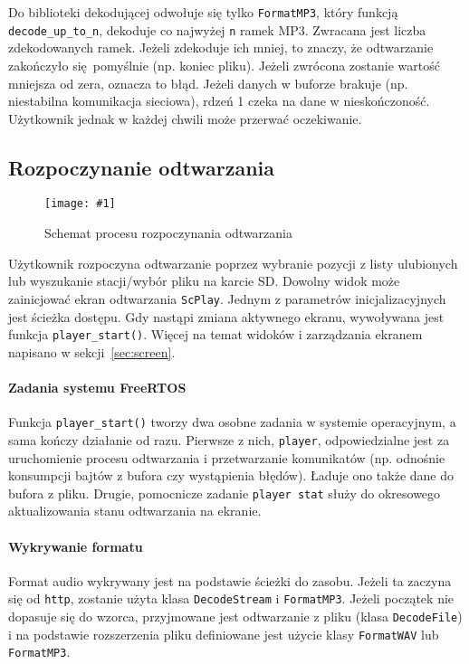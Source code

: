 \documentclass[polish]{aghengthesis}
\newcommand{\imgint}[4]{
	\begin{figure}[{#4}]
		\centering
		\texttt{[image: \#1]}
		\caption{#2}
		\label{#1}
	\end{figure}
}
\newcommand{\imgcs}[3]{\imgint{#1}{#2}{#3}{}}
\begin{document}
			Do biblioteki dekodującej odwołuje się tylko \lstinline|FormatMP3|, który funkcją \lstinline|decode_up_to_n|, dekoduje co najwyżej \lstinline|n| ramek MP3. Zwracana jest liczba zdekodowanych ramek. Jeżeli zdekoduje ich mniej, to znaczy, że odtwarzanie zakończyło się pomyślnie (np. koniec pliku). Jeżeli zwrócona zostanie wartość mniejsza od zera, oznacza to błąd. Jeżeli danych w buforze brakuje (np. niestabilna komunikacja sieciowa), rdzeń 1 czeka na dane w nieskończoność. Użytkownik jednak w każdej chwili może przerwać oczekiwanie.
		
		\subsection{Rozpoczynanie odtwarzania}
			\imgcs{3/PicoRadio-start}{Schemat procesu rozpoczynania odtwarzania}{0.7}
			Użytkownik rozpoczyna odtwarzanie poprzez wybranie pozycji z listy ulubionych lub wyszukanie stacji/wybór pliku na karcie SD. Dowolny widok może zainicjować ekran odtwarzania \lstinline|ScPlay|. Jednym z parametrów inicjalizacyjnych jest ścieżka dostępu. Gdy nastąpi zmiana aktywnego ekranu, wywoływana jest funkcja \lstinline|player_start()|. Więcej na temat widoków i zarządzania ekranem napisano w sekcji~\ref{sec:screen}.
			
			\paragraph{Zadania systemu FreeRTOS}
				Funkcja \lstinline|player_start()| tworzy dwa osobne zadania w systemie operacyjnym, a sama kończy działanie od razu. Pierwsze z nich, \lstinline|player|, odpowiedzialne jest za uruchomienie procesu odtwarzania i przetwarzanie komunikatów (np. odnośnie konsumpcji bajtów z bufora czy wystąpienia błędów). Ładuje ono także dane do bufora z pliku. Drugie, pomocnicze zadanie \lstinline|player stat| służy do okresowego aktualizowania stanu odtwarzania na ekranie.
			
			\paragraph{Wykrywanie formatu}
				Format audio wykrywany jest na podstawie ścieżki do zasobu. Jeżeli ta zaczyna się od \lstinline|http|, zostanie użyta klasa \lstinline|DecodeStream| i \lstinline|FormatMP3|. Jeżeli początek nie dopasuje się do wzorca, przyjmowane jest odtwarzanie z pliku (klasa \lstinline|DecodeFile|) i na podstawie rozszerzenia pliku definiowane jest użycie klasy \lstinline|FormatWAV| lub \lstinline|FormatMP3|.
				
\end{document}
